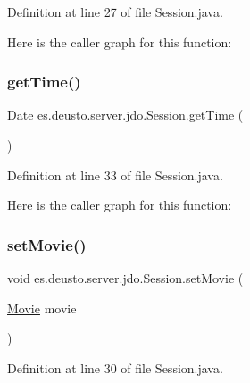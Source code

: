 Definition at line 27 of file Session.\+java.

Here is the caller graph for this function\+:
\mbox{\label{classes_1_1deusto_1_1server_1_1jdo_1_1_session_aa2855c0e0f810bc64c6c84fbfab2f977}} 
\subsubsection{\texorpdfstring{getTime()}{getTime()}}
{\footnotesize\ttfamily Date es.\+deusto.\+server.\+jdo.\+Session.\+get\+Time (\begin{DoxyParamCaption}{ }\end{DoxyParamCaption})}



Definition at line 33 of file Session.\+java.

Here is the caller graph for this function\+:
\mbox{\label{classes_1_1deusto_1_1server_1_1jdo_1_1_session_ae4e58ddc0ec278e4f16eba20755b5ceb}} 
\subsubsection{\texorpdfstring{setMovie()}{setMovie()}}
{\footnotesize\ttfamily void es.\+deusto.\+server.\+jdo.\+Session.\+set\+Movie (\begin{DoxyParamCaption}\item[{\mbox{\hyperlink{classes_1_1deusto_1_1server_1_1jdo_1_1_movie}{Movie}}}]{movie }\end{DoxyParamCaption})}



Definition at line 30 of file Session.\+java.

\mbox{\label{classes_1_1deusto_1_1server_1_1jdo_1_1_session_a24a0fb018aaa31864d30260cfadfc1f0}} 
